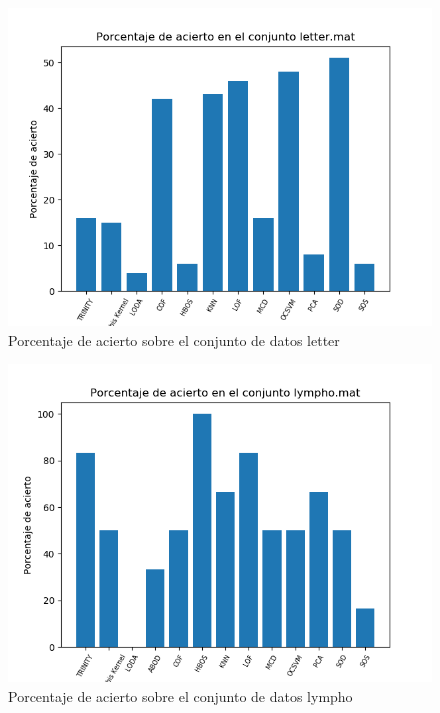 \begin{figure}[H]
	\centering
	\label{letter_accuracy}
	\includegraphics[scale=0.7]{imagenes/imgs-exp1/accuracy/letter}
	\caption{Porcentaje de acierto sobre el conjunto de datos letter}
\end{figure}

\begin{figure}[H]
	\centering
	\label{lympho_accuracy}
	\includegraphics[scale=0.7]{imagenes/imgs-exp1/accuracy/lympho}
	\caption{Porcentaje de acierto sobre el conjunto de datos lympho}
\end{figure}


